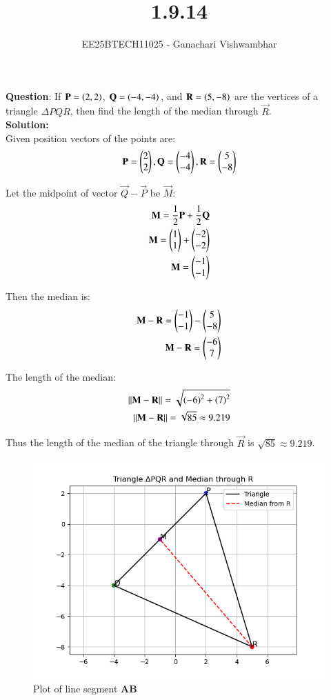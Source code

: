 \documentclass[journal]{IEEEtran}
\begin{document}
\title{1.9.14}
\author{EE25BTECH11025 - Ganachari Vishwambhar}
\maketitle

\textbf{Question}:\newline
If $\mathbf{P}=\left(2,2\right)$, $\mathbf{Q}=\left(-4,-4\right)$, and $\mathbf{R}=\left(5,-8\right)$ are the vertices of a triangle $\Delta PQR$, then find the length of the median through $\vec{R}$.\\
\textbf{Solution: }\\
Given position vectors of the points are:
\begin{align}
    \mathbf{P}=\begin{pmatrix}2\\2\end{pmatrix},
    \mathbf{Q}=\begin{pmatrix}-4\\-4\end{pmatrix},
    \mathbf{R}=\begin{pmatrix}5\\-8\end{pmatrix}
\end{align}

Let the midpoint of vector $\vec{Q}-\vec{P}$ be $\vec{M}$:
\begin{align}
    \mathbf{M}=\frac{1}{2}\mathbf{P}+\frac{1}{2}\mathbf{Q}\\
    \mathbf{M}=\begin{pmatrix}1\\1\end{pmatrix}+\begin{pmatrix}-2\\-2\end{pmatrix}\\
    \mathbf{M}=\begin{pmatrix}-1\\-1\end{pmatrix}
\end{align}

Then the median is:
\begin{align}
    \mathbf{M}-\mathbf{R}=\begin{pmatrix}-1\\-1\end{pmatrix}-\begin{pmatrix}5\\-8\end{pmatrix}\\
    \mathbf{M}-\mathbf{R}=\begin{pmatrix}-6\\7\end{pmatrix}
\end{align}

The length of the median:
\begin{align}
    ||\mathbf{M}-\mathbf{R}||=\sqrt{\left(-6\right)^2+\left(7\right)^2}\\
    ||\mathbf{M}-\mathbf{R}||=\sqrt{85}\approx9.219
\end{align}

Thus the length of the median of the triangle through $\vec{R}$ is $\sqrt{85}\approx9.219$.

\begin{figure}[h!]
   \centering
   \includegraphics[width=0.7\linewidth]{figs/plot.png}
   \caption{Plot of line segment \textbf{AB}}
   \label{}
\end{figure}
\end{document}
